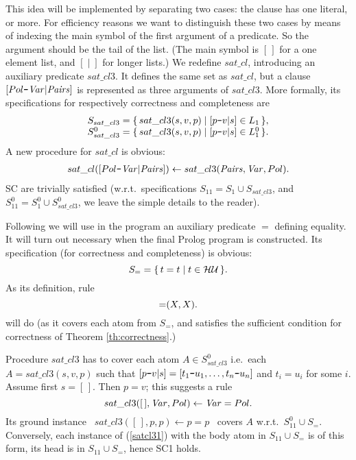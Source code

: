 \documentclass{tlp}
\newcommand*{\mydash}{{\mbox{\tt-}}}
\newcommand*{\HU}{{\ensuremath{\cal{H U}}}\xspace}
\begin{document}
This idea will be implemented 
 by separating two cases: the clause has one literal, or more.
For efficiency reasons we want to distinguish these two cases by means of
indexing the main symbol of the first argument of a predicate.
So the argument should be the tail of the list.  (The main symbol is $[\,]$
for a one element list, and $[\;|\;]$ for longer lists.)
We redefine  $sat\_cl$, 
introducing an auxiliary predicate $sat\_cl3$.
It defines the same set as $sat\_cl$, but a clause 
$[Pol\mydash {\it Var} | {\it Pairs}]$ is represented as three arguments 
of  $sat\_cl3$.
More formally, its specifications for respectively correctness and
completeness are
\[
\begin{array}{l}
  S_{sat\_cl3} = \{\, sat\_cl3(s,v,p) \mid   [p\mydash v|s]\in L_1 \,\},
\\
  S_{sat\_cl3}^0 = \{\, sat\_cl3(s,v,p) \mid [p\mydash v|s]\in L_1^0 \,\}.
\end{array}
\]
A new procedure for  $sat\_cl$ is obvious:
\begin{equation}
\begin{array}{l}
sat\_cl([Pol\mydash {\it Var} | {\it Pairs}]) \gets sat\_cl3({\it Pairs}, {\it Var}, Pol). 
\end{array}
\label{satcl}
\end{equation}
SC are trivially satisfied
(w.r.t.\ specifications $S_{11}=S_1\cup S_{sat\_cl3}$,
and $S_{11}^0= S_1^0\cup S_{sat\_cl3}^0$,
we leave the simple details to the reader).

Following \cite{howe.king.tcs-shorter} we will use in the program
an auxiliary predicate $=$ defining equality.  It will turn out necessary
when the final Prolog program is constructed.  Its specification 
(for correctness and completeness)
is obvious:
\[
S_= = \{\, t=t \mid t\in \HU\,\}.
\setlength\belowdisplayshortskip{3pt plus 1pt minus 7pt}
\]
As its definition, rule
\begin{equation}
\setlength\abovedisplayshortskip{3pt plus 1pt minus 7pt}
{=}(X,X).
\label{ruleeq}  
\end{equation}
will do
(as it covers each atom from $S_=$, and satisfies the sufficient condition 
for correctness of Theorem \ref{th:correctness}.)



Procedure  $sat\_cl3$ has to cover each atom 
$A \in S_{sat\_cl3}^0$
i.e.\ each $A = sat\_cl3(s,v,p)$ such that
$[p\mydash v|s] = [t_1\mydash u_1,\ldots,t_n\mydash u_n]$ and $t_i=u_i$ for
some $i$.
Assume first $s=[\,]$.  Then $p=v$; this suggests a rule
\begin{equation}
    sat\_cl3([\,], {\it Var}, Pol) \gets {\it Var} = Pol. 
    \label{satcl31}
\end{equation}
Its ground instance 
\ $sat\_cl3([\,], p, p)  \gets p\mathop{=} p$ \ 
covers $A$ w.r.t.\ $S_{11}^0\cup S_=$.  Conversely, each instance of  (\ref{satcl31})
with the body atom in $S_{11}\cup S_=$ is of this form, its head is in $S_{11}\cup S_=$,
hence SC1 holds.
\end{document}
